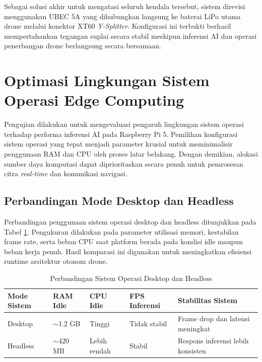 Sebagai solusi akhir untuk mengatasi seluruh kendala tersebut, sistem direvisi menggunakan UBEC 5A yang dihubungkan langsung ke baterai LiPo utama drone melalui konektor XT60 \textit{Y-Splitter}. Konfigurasi ini terbukti berhasil mempertahankan tegangan suplai secara stabil meskipun inferensi AI dan operasi penerbangan drone berlangsung secara bersamaan.
\section{Optimasi Lingkungan Sistem Operasi Edge Computing}

Pengujian dilakukan untuk mengevaluasi pengaruh lingkungan sistem operasi terhadap performa inferensi AI pada Raspberry Pi 5. Pemilihan konfigurasi sistem operasi yang tepat menjadi parameter krusial untuk meminimalisir penggunaan RAM dan CPU oleh proses latar belakang. Dengan demikian, alokasi sumber daya komputasi dapat diprioritaskan secara penuh untuk pemrosesan citra \textit{real-time} dan komunikasi navigasi.

\subsection{Perbandingan Mode Desktop dan Headless}

Perbandingan penggunaan sistem operasi desktop dan headless ditunjukkan pada Tabel \ref{tab:headless_compare}. Pengukuran dilakukan pada parameter utilisasi memori, kestabilan frame rate, serta beban CPU saat platform berada pada kondisi idle maupun beban kerja penuh. Hasil komparasi ini digunakan untuk meningkatkan efisiensi runtime arsitektur otonom drone.

\begin{table}[H]
	\centering
	\caption{Perbandingan Sistem Operasi Desktop dan Headless}
	\label{tab:headless_compare}
	\renewcommand{\arraystretch}{1.2}
	\begin{tabular}{|p{3cm}|p{2.5cm}|p{2.5cm}|p{2.5cm}|p{3cm}|}
		\hline
		Mode Sistem & RAM Idle & CPU Idle & FPS Inferensi & Stabilitas Sistem \\ \hline
		
		Desktop &
		$\sim$1.2 GB &
		Tinggi &
		Tidak stabil &
		Frame drop dan latensi meningkat \\ \hline
		
		Headless &
		$\sim$420 MB &
		Lebih rendah &
		Stabil &
		Respons inferensi lebih konsisten \\ \hline
	\end{tabular}
\end{table}

